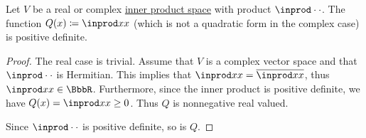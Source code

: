 \begin{lemma}\label{thm:inner_product_quadratic_form_is_positive_definite}
  Let \( V \) be a real or complex \hyperref[def:inner_product_space]{inner product space} with product \( \inprod \cdot \cdot \). The function \( Q(x) \coloneqq \inprod x x \) (which is not a quadratic form in the complex case) is positive definite.
\end{lemma}
\begin{proof}
  The real case is trivial. Assume that \( V \) is a complex vector space and that \( \inprod \cdot \cdot \) is Hermitian. This implies that \( \inprod x x = \overline{\inprod x x} \), thus \( \inprod x x \in \BbbR \). Furthermore, since the inner product is positive definite, we have \( Q(x) = \inprod x x \geq 0 \). Thus \( Q \) is nonnegative real valued.

  Since \( \inprod \cdot \cdot \) is positive definite, so is \( Q \).
\end{proof}

